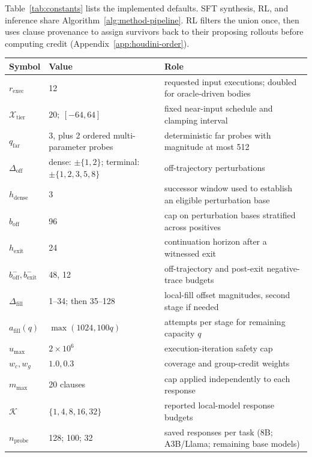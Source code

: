 Table~\ref{tab:constants} lists the implemented defaults.  SFT synthesis,
RL, and inference share Algorithm~\ref{alg:method-pipeline}.  RL filters the
union once, then uses clause provenance to assign survivors back to their
proposing rollouts before computing credit
(Appendix~\ref{app:houdini-order}).

\begin{table}[H]
\centering
\begin{tabular}{p{2.6cm}p{3.1cm}p{5.9cm}}
\toprule
\rowcolor{algobg}
\textbf{Symbol} & \textbf{Value} & \textbf{Role} \\
\midrule
\(r_{\mathrm{exec}}\) & 12 & requested input executions; doubled for oracle-driven bodies \\
\(\mathcal X_{\mathrm{tier}}\) & \(20;\ [-64,64]\) & fixed near-input schedule and clamping interval \\
\(q_{\mathrm{far}}\) & 3, plus 2 ordered multi-parameter probes & deterministic far probes with magnitude at most 512 \\
\(\Delta_{\mathrm{off}}\) & dense: \(\pm\{1,2\}\); terminal: \(\pm\{1,2,3,5,8\}\) & off-trajectory perturbations \\
\(h_{\mathrm{dense}}\) & 3 & successor window used to establish an eligible perturbation base \\
\(b_{\mathrm{off}}\) & 96 & cap on perturbation bases stratified across positives \\
\(h_{\mathrm{exit}}\) & 24 & continuation horizon after a witnessed exit \\
\(b^-_{\mathrm{off}},b^-_{\mathrm{exit}}\) & 48, 12 & off-trajectory and post-exit negative-trace budgets \\
\(\Delta_{\mathrm{fill}}\) & 1--34; then 35--128 & local-fill offset magnitudes, second stage if needed \\
\(a_{\mathrm{fill}}(q)\) & \(\max(1024,100q)\) & attempts per stage for remaining capacity \(q\) \\
\(u_{\max}\) & \(2\times10^6\) & execution-iteration safety cap \\
\midrule
\(w_c,w_g\) & \(1.0,0.3\) & coverage and group-credit weights \\
\(m_{\max}\) & 20 clauses & cap applied independently to each response \\
\(\mathcal K\) & \(\{1,4,8,16,32\}\) & reported local-model response budgets \\
\(n_{\mathrm{probe}}\) & 128; 100; 32 & saved responses per task (8B; A3B/Llama; remaining base models) \\

\end{tabular}
\end{table}
